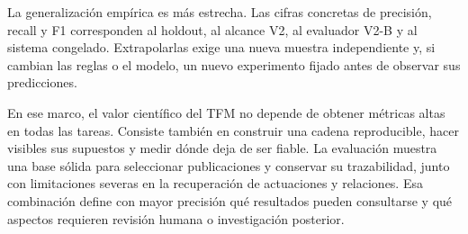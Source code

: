 La generalización empírica es más estrecha. Las cifras concretas de precisión,
recall y F1 corresponden al holdout, al alcance V2, al evaluador V2-B y al
sistema congelado. Extrapolarlas exige una nueva muestra independiente y,
si cambian las reglas o el modelo, un nuevo experimento fijado antes de observar
sus predicciones.

En ese marco, el valor científico del TFM no depende de obtener métricas altas
en todas las tareas. Consiste también en construir una cadena reproducible,
hacer visibles sus supuestos y medir dónde deja de ser fiable. La evaluación
muestra una base sólida para seleccionar publicaciones y conservar su
trazabilidad, junto con limitaciones severas en la recuperación de actuaciones
y relaciones. Esa combinación define con mayor precisión qué resultados pueden
consultarse y qué aspectos requieren revisión humana o investigación posterior.
